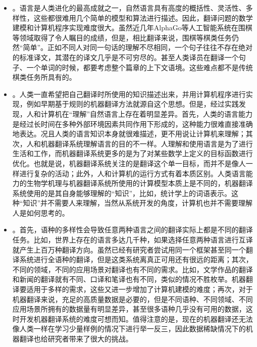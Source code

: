 \begin{itemize}
\vspace{0.5em}
\item {\small{}}。语言是人类进化的最高成就之一，自然语言具有高度的概括性、灵活性、多样性，这些都很难用几个简单的模型和算法进行描述。因此，翻译问题的数学建模和计算机程序实现难度很大。虽然近几年AlphaGo等人工智能系统在围棋等领域取得了令人瞩目的成绩，但是，相比翻译来说，围棋等棋类任务仍然``简单''。正如不同人对同一句话的理解不尽相同，一个句子往往不存在绝对的标准译文，其潜在的译文几乎是不可穷尽的。甚至人类译员在翻译一个句子、一个单词的时候，都要考虑整个篇章的上下文语境。这些难点都不是传统棋类任务所具有的。
\vspace{0.5em}
\item {\small{}}。人类一直希望把自己翻译时所使用的知识描述出来，并用计算机程序进行实现，例如早期基于规则的机器翻译方法就源自这个思想。但是，经过实践发现，人和计算机在``理解''自然语言上存在着明显差异。首先，人类的语言能力是经过长时间在多种外部环境因素共同作用下形成的，这种能力很难直接准确地表达。况且人类的语言知识本身就很难描述，更不用说让计算机来理解；其次，人和机器翻译系统理解语言的目的不一样。人理解和使用语言是为了进行生活和工作，而机器翻译系统更多的是为了对某些数学上定义的目标函数进行优化。也就是说，机器翻译系统关注的是翻译这个单一目标，而并不是像人一样进行复杂的活动；此外，人和计算机的运行方式有着本质区别。人类语言能力的生物学机理与机器翻译系统所使用的计算模型本质上是不同的，机器翻译系统使用的是其自身能够理解的``知识''，比如，统计学上的词语表示。这种``知识''并不需要人来理解，当然从系统开发的角度，计算机也并不需要理解人是如何思考的。
\vspace{0.5em}
\item {\small{}}。首先，语种的多样性会导致任意两种语言之间的翻译实际上都是不同的翻译任务。比如，世界上存在的语言多达几千种，如果选择任意两种语言进行互译就产生上百万种翻译方向。虽然已经有研究者尝试用同一个框架甚至同一个翻译系统进行全语种的翻译，但是这类系统离真正可用还有很远的距离；其次，不同的领域，不同的应用场景对翻译也有不同的需求。比如，文学作品的翻译和新闻的翻译就有不同、口译和笔译也有不同，类似的情况不胜枚举。机器翻译要适用于多样的需求，这些又进一步增加了计算机建模的难度；再次，对于机器翻译来说，充足的高质量数据是必要的，但是不同语种、不同领域、不同应用场景所拥有的数据量有明显差异，甚至很多语种几乎没有可用的数据，这时开发机器翻译系统的难度可想而知。值得注意的是，现在的机器翻译还无法像人类一样在学习少量样例的情况下进行举一反三，因此数据稀缺情况下的机器翻译也给研究者带来了很大的挑战。
\vspace{0.5em}
\end{itemize}



